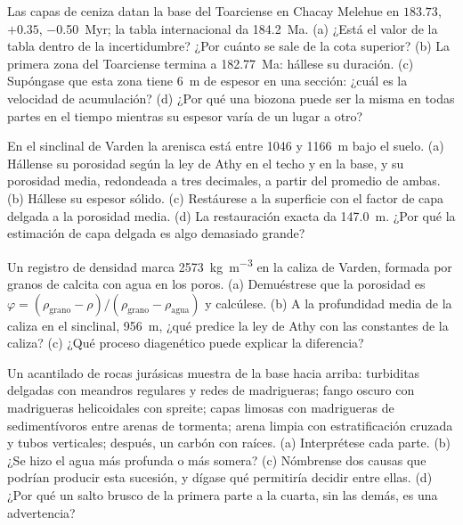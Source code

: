 \begin{exercise}[$\star\star$]\label{exo:b2:palaeoenvironments:6}
Las capas de ceniza datan la base del Toarciense en Chacay Melehue en $183.73$, $+0.35$, \qty{-0.50}{Myr};
la tabla internacional da \qty{184.2}{Ma}. (a) ¿Está el valor de la tabla dentro de la incertidumbre?
¿Por cuánto se sale de la cota superior? (b) La primera zona del Toarciense termina a
\qty{182.77}{Ma}: hállese su duración. (c) Supóngase que esta zona tiene \qty{6}{m} de espesor en una sección:
¿cuál es la velocidad de acumulación? (d) ¿Por qué una biozona puede ser la misma en todas partes en el tiempo mientras su
espesor varía de un lugar a otro?
\end{exercise}

\begin{exercise}[$\star\star$]\label{exo:b2:palaeoenvironments:7}
En el sinclinal de Varden la arenisca está entre 1046 y \qty{1166}{m} bajo el suelo. (a)
Hállense su porosidad según la ley de Athy en el techo y en la base, y su porosidad media, redondeada a
tres decimales, a partir del promedio de ambas. (b) Hállese su espesor sólido. (c) Restáurese a la
superficie con el factor de capa delgada a la porosidad media. (d) La restauración exacta da
\qty{147.0}{m}. ¿Por qué la estimación de capa delgada es algo demasiado grande?
\end{exercise}

\begin{exercise}[$\star\star$]\label{exo:b2:palaeoenvironments:8}
Un registro de densidad marca \qty{2573}{kg.m^{-3}} en la caliza de Varden, formada por granos de calcita con
agua en los poros. (a) Demuéstrese que la porosidad es $\varphi = (\rho_{\text{grano}} -
\rho)/(\rho_{\text{grano}} - \rho_{\text{agua}})$ y calcúlese. (b) A la profundidad media de la
caliza en el sinclinal, \qty{956}{m}, ¿qué predice la ley de Athy con las constantes de la caliza?
(c) ¿Qué proceso diagenético puede explicar la diferencia?
\end{exercise}

\begin{exercise}[$\star\star$]\label{exo:b2:palaeoenvironments:9}
Un acantilado de rocas jurásicas muestra de la base hacia arriba: turbiditas delgadas con meandros regulares y redes de
madrigueras; fango oscuro con madrigueras helicoidales con spreite; capas limosas con madrigueras de sedimentívoros entre
arenas de tormenta; arena limpia con estratificación cruzada y
tubos verticales; después, un carbón con raíces. (a) Interprétese cada parte. (b) ¿Se hizo el agua más profunda o más
somera? (c) Nómbrense dos causas que podrían producir esta sucesión, y dígase qué permitiría decidir
entre ellas. (d) ¿Por qué un salto brusco de la primera parte a la cuarta, sin las demás, es una
advertencia?
\end{exercise}

